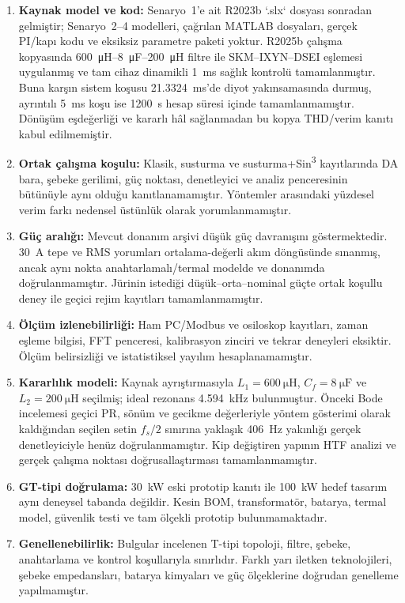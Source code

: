 \begin{enumerate}
  \item \textbf{Kaynak model ve kod:} Senaryo~1'e ait R2023b `.slx` dosyası sonradan gelmiştir; Senaryo~2--4 modelleri, çağrılan MATLAB dosyaları, gerçek PI/kapı kodu ve eksiksiz parametre paketi yoktur. R2025b çalışma kopyasında \SI{600}{\micro\henry}--\SI{8}{\micro\farad}--\SI{200}{\micro\henry} filtre ile SKM--IXYN--DSEI eşlemesi uygulanmış ve tam cihaz dinamikli \SI{1}{\milli\second} sağlık kontrolü tamamlanmıştır. Buna karşın sistem koşusu \SI{21.3324}{\milli\second}'de diyot yakınsamasında durmuş, ayrıntılı \SI{5}{\milli\second} koşu ise 1200~s hesap süresi içinde tamamlanmamıştır. Dönüşüm eşdeğerliği ve kararlı hâl sağlanmadan bu kopya THD/verim kanıtı kabul edilmemiştir.
  \item \textbf{Ortak çalışma koşulu:} Klasik, susturma ve susturma+Sin\textsuperscript{3} kayıtlarında DA bara, şebeke gerilimi, güç noktası, denetleyici ve analiz penceresinin bütünüyle aynı olduğu kanıtlanamamıştır. Yöntemler arasındaki yüzdesel verim farkı nedensel üstünlük olarak yorumlanmamıştır.
  \item \textbf{Güç aralığı:} Mevcut donanım arşivi düşük güç davranışını göstermektedir. 30~A tepe ve RMS yorumları ortalama-değerli akım döngüsünde sınanmış, ancak aynı nokta anahtarlamalı/termal modelde ve donanımda doğrulanmamıştır. Jürinin istediği düşük--orta--nominal güçte ortak koşullu deney ile geçici rejim kayıtları tamamlanmamıştır.
  \item \textbf{Ölçüm izlenebilirliği:} Ham PC/Modbus ve osiloskop kayıtları, zaman eşleme bilgisi, FFT penceresi, kalibrasyon zinciri ve tekrar deneyleri eksiktir. Ölçüm belirsizliği ve istatistiksel yayılım hesaplanamamıştır.
  \item \textbf{Kararlılık modeli:} Kaynak ayrıştırmasıyla $L_1=\SI{600}{\micro\henry}$, $C_f=\SI{8}{\micro\farad}$ ve $L_2=\SI{200}{\micro\henry}$ seçilmiş; ideal rezonans \SI{4.594}{\kilo\hertz} bulunmuştur. Önceki Bode incelemesi geçici PR, sönüm ve gecikme değerleriyle yöntem gösterimi olarak kaldığından seçilen setin $f_s/2$ sınırına yaklaşık \SI{406}{\hertz} yakınlığı gerçek denetleyiciyle henüz doğrulanmamıştır. Kip değiştiren yapının HTF analizi ve gerçek çalışma noktası doğrusallaştırması tamamlanmamıştır.
  \item \textbf{GT-tipi doğrulama:} \SI{30}{\kilo\watt} eski prototip kanıtı ile \SI{100}{\kilo\watt} hedef tasarım aynı deneysel tabanda değildir. Kesin BOM, transformatör, batarya, termal model, güvenlik testi ve tam ölçekli prototip bulunmamaktadır.
  \item \textbf{Genellenebilirlik:} Bulgular incelenen T-tipi topoloji, filtre, şebeke, anahtarlama ve kontrol koşullarıyla sınırlıdır. Farklı yarı iletken teknolojileri, şebeke empedansları, batarya kimyaları ve güç ölçeklerine doğrudan genelleme yapılmamıştır.
\end{enumerate}

